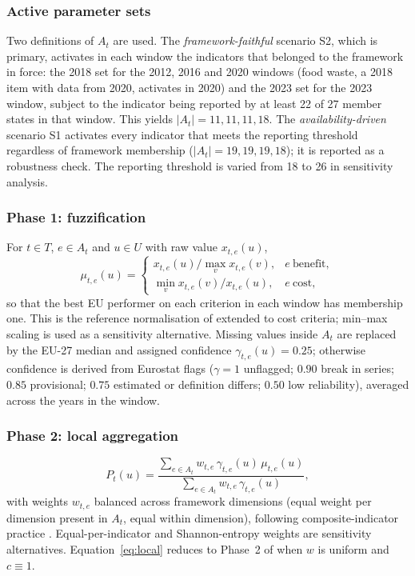 \documentclass[a4paper,fleqn]{cas-sc}
\begin{document}


\subsubsection{Active parameter sets} Two definitions of $A_t$ are used. The \emph{framework-faithful} scenario S2, which is primary, activates in each window the indicators that belonged to the framework in force: the 2018 set for the 2012, 2016 and 2020 windows (food waste, a 2018 item with data from 2020, activates in 2020) and the 2023 set for the 2023 window, subject to the indicator being reported by at least 22 of 27 member states in that window. This yields $|A_t|=11,11,11,18$. The \emph{availability-driven} scenario S1 activates every indicator that meets the reporting threshold regardless of framework membership ($|A_t|=19,19,19,18$); it is reported as a robustness check. The reporting threshold is varied from 18 to 26 in sensitivity analysis.

\subsubsection{Phase 1: fuzzification} For $t\in T$, $e\in A_t$ and $u\in U$ with raw value $x_{t,e}(u)$,
\begin{equation}
\mu_{t,e}(u)=\begin{cases}x_{t,e}(u)/\max_{v}x_{t,e}(v), & e\ \text{benefit},\\ \min_{v}x_{t,e}(v)/x_{t,e}(u), & e\ \text{cost},\end{cases}\label{eq:fuzz}
\end{equation}
so that the best EU performer on each criterion in each window has membership one. This is the reference normalisation of \citet{SAEED2026200504} extended to cost criteria; min--max scaling is used as a sensitivity alternative. Missing values inside $A_t$ are replaced by the EU-27 median and assigned confidence $\gamma_{t,e}(u)=0.25$; otherwise confidence is derived from Eurostat flags ($\gamma=1$ unflagged; $0.90$ break in series; $0.85$ provisional; $0.75$ estimated or definition differs; $0.50$ low reliability), averaged across the years in the window.

\subsubsection{Phase 2: local aggregation} 
\begin{equation}
P_t(u)=\frac{\sum_{e\in A_t} w_{t,e}\,\gamma_{t,e}(u)\,\mu_{t,e}(u)}{\sum_{e\in A_t} w_{t,e}\,\gamma_{t,e}(u)},\label{eq:local}
\end{equation}
with weights $w_{t,e}$ balanced across framework dimensions (equal weight per dimension present in $A_t$, equal within dimension), following composite-indicator practice \citep{oecd2008handbook}. Equal-per-indicator and Shannon-entropy weights \citep{shannon1948} are sensitivity alternatives. Equation~\eqref{eq:local} reduces to Phase~2 of \citet{SAEED2026200504} when $w$ is uniform and $c\equiv1$.
\end{document}
